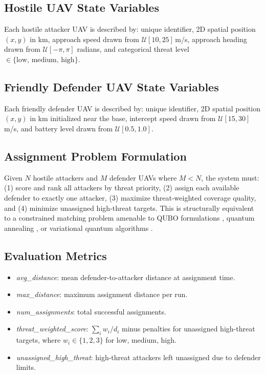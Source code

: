 \documentclass[12pt, a4paper]{article}
\begin{document}
\subsection{Hostile UAV State Variables}

Each hostile attacker UAV is described by: unique identifier, 2D spatial position $(x, y)$ in km, approach speed drawn from $\mathcal{U}[10, 25]$\,m/s, approach heading drawn from $\mathcal{U}[-\pi, \pi]$ radians, and categorical threat level $\in \{\text{low, medium, high}\}$.

\subsection{Friendly Defender UAV State Variables}

Each friendly defender UAV is described by: unique identifier, 2D spatial position $(x, y)$ in km initialized near the base, intercept speed drawn from $\mathcal{U}[15, 30]$\,m/s, and battery level drawn from $\mathcal{U}[0.5, 1.0]$.

\subsection{Assignment Problem Formulation}

Given $N$ hostile attackers and $M$ defender UAVs where $M < N$, the system must: (1) score and rank all attackers by threat priority, (2) assign each available defender to exactly one attacker, (3) maximize threat-weighted coverage quality, and (4) minimize unassigned high-threat targets. This is structurally equivalent to a constrained matching problem amenable to QUBO formulations \cite{lucas2014ising}, quantum annealing \cite{kadowaki1998quantum}, or variational quantum algorithms \cite{farhi2014quantum}.

\subsection{Evaluation Metrics}

\begin{itemize}
  \item \textit{avg\_distance}: mean defender-to-attacker distance at assignment time.
  \item \textit{max\_distance}: maximum assignment distance per run.
  \item \textit{num\_assignments}: total successful assignments.
  \item \textit{threat\_weighted\_score}: $\sum_i w_i / d_i$ minus penalties for unassigned high-threat targets, where $w_i \in \{1,2,3\}$ for low, medium, high.
  \item \textit{unassigned\_high\_threat}: high-threat attackers left unassigned due to defender limits.
\end{itemize}
\end{document}
